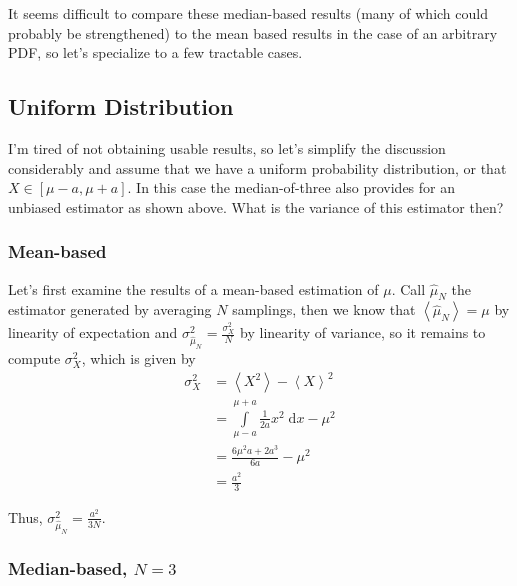 \documentclass[10pt]{article}
\newcommand{\expvalue}[1]{\left<#1\right>}
\begin{document}
It seems difficult to compare these median-based results (many of which could
probably be strengthened) to the mean based results in the case of an arbitrary
PDF, so let's specialize to a few tractable cases.

\subsection{Uniform Distribution}

I'm tired of not obtaining usable results, so let's simplify the discussion
considerably and assume that we have a uniform probability distribution, or that
$X \in [\mu - a, \mu + a]$. In this case the median-of-three also provides for
an unbiased estimator as shown above.  What is the variance of this estimator
then?

\subsubsection{Mean-based}

Let's first examine the results of a mean-based estimation of $\mu$. Call
$\hat{\mu}_N$ the estimator generated by averaging $N$ samplings, then we know
that $\expvalue{\hat{\mu}_N} = \mu$ by linearity of expectation and
$\sigma_{\hat{\mu}_N}^2 = \frac{\sigma_X^2}{N}$ by linearity of variance, so
it remains to compute $\sigma_X^2$, which is given by
\begin{align}
    \sigma_X^2 &= \expvalue{X^2} - \expvalue{X}^2\\
    &= \int\limits_{\mu - a}^{\mu + a}\frac{1}{2a}x^2\;\mathrm{d}x - \mu^2\\
    &= \frac{6\mu^2a + 2a^3}{6a} - \mu^2\\
    &= \frac{a^2}{3}
\end{align}

Thus, $\sigma_{\hat{\mu}_N}^2 = \frac{a^2}{3N}$.

\subsubsection{Median-based, $N=3$}
\end{document}
